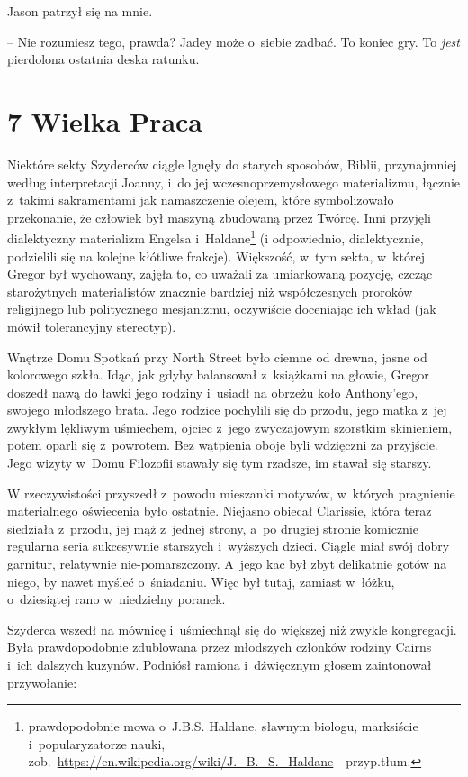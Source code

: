 \documentclass[oneside,polish,12pt,sfheadings]{mwbk}
\begin{document}
Jason patrzył się na mnie. 

-- Nie rozumiesz tego, prawda? Jadey może o~siebie zadbać. To koniec gry. To \emph{jest } pierdolona ostatnia deska
ratunku.


\chapter[Wielka Praca]{7 Wielka Praca}

Niektóre sekty Szyderców ciągle lgnęły do starych sposobów, Biblii,
przynajmniej według interpretacji Joanny, i~do jej wczesnoprzemysłowego
materializmu, łącznie z~takimi sakramentami jak namaszczenie olejem,
które symbolizowało przekonanie, że człowiek był maszyną zbudowaną przez
Twórcę. Inni przyjęli dialektyczny materializm Engelsa i~Haldane\footnote{prawdopodobnie mowa o~J.B.S. Haldane,
sławnym biologu, marksiście i~popularyzatorze nauki, zob.~\url{https://en.wikipedia.org/wiki/J.\_B.\_S.\_Haldane} - przyp.tłum.} (i
odpowiednio, dialektycznie, podzielili się na kolejne kłótliwe frakcje).
Większość, w~tym sekta, w~której Gregor był wychowany, zajęła to, co
uważali za umiarkowaną pozycję, czcząc starożytnych materialistów
znacznie bardziej niż współczesnych proroków religijnego lub
politycznego mesjanizmu, oczywiście doceniając ich wkład (jak mówił
tolerancyjny stereotyp).

Wnętrze Domu Spotkań przy North Street było ciemne od drewna, jasne od
kolorowego szkła. Idąc, jak gdyby balansował z~książkami na głowie,
Gregor doszedł nawą do ławki jego rodziny i~usiadł na obrzeżu koło
Anthony'ego, swojego młodszego brata. Jego rodzice pochylili się do
przodu, jego matka z~jej zwykłym lękliwym uśmiechem, ojciec z~jego
zwyczajowym szorstkim skinieniem, potem oparli się z~powrotem. Bez
wątpienia oboje byli wdzięczni za przyjście. Jego wizyty w~Domu
Filozofii stawały się tym rzadsze, im stawał się starszy.

W rzeczywistości przyszedł z~powodu mieszanki motywów, w~których
pragnienie materialnego oświecenia było ostatnie. Niejasno obiecał
Clarissie, która teraz siedziała z~przodu, jej mąż z~jednej strony, a~po
drugiej stronie komicznie regularna seria sukcesywnie starszych i~wyższych dzieci. Ciągle miał swój dobry garnitur, relatywnie
nie-pomarszczony. A~jego kac był zbyt delikatnie gotów na niego, by
nawet myśleć o~śniadaniu. Więc był tutaj, zamiast w~łóżku, o~dziesiątej
rano w~niedzielny poranek.

Szyderca wszedł na mównicę i~uśmiechnął się do większej niż zwykle
kongregacji. Była prawdopodobnie zdublowana przez młodszych członków
rodziny Cairns i~ich dalszych kuzynów. Podniósł ramiona i~dźwięcznym
głosem zaintonował przywołanie:\\
\end{document}
